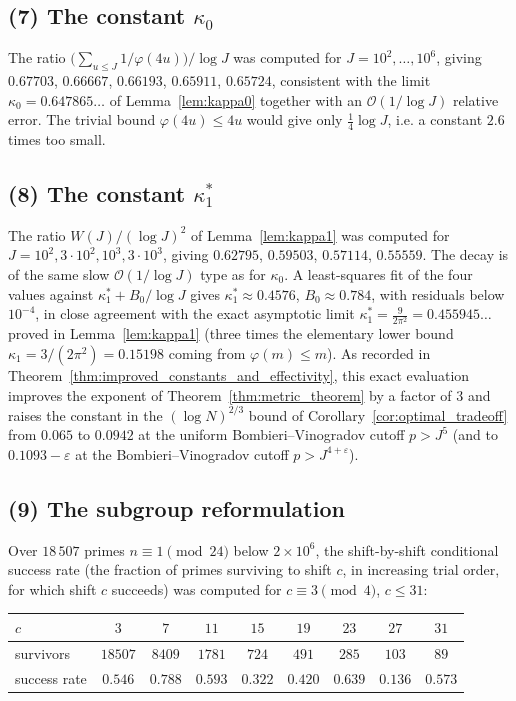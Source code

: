 \documentclass[11pt, a4paper]{article}
\theoremstyle{plain}
\theoremstyle{definition}
\begin{document}
\subsection*{(7) The constant $\kappa_0$}
The ratio $\big(\sum_{u\le J}1/\varphi(4u)\big)/\log J$ was computed for $J=10^{2},\dots,10^{6}$, giving $0.67703$, $0.66667$, $0.66193$, $0.65911$, $0.65724$, consistent with the limit $\kappa_0=0.647865\ldots$ of Lemma~\ref{lem:kappa0} together with an $\mathcal{O}(1/\log J)$ relative error. The trivial bound $\varphi(4u)\le4u$ would give only $\frac14\log J$, i.e. a constant $2.6$ times too small.

\subsection*{(8) The constant $\kappa_1^{\ast}$}
The ratio $W(J)/(\log J)^{2}$ of Lemma~\ref{lem:kappa1} was computed for $J=10^{2},3\cdot10^{2},10^{3},3\cdot10^{3}$, giving $0.62795$, $0.59503$, $0.57114$, $0.55559$. The decay is of the same slow $\mathcal{O}(1/\log J)$ type as for $\kappa_0$. A least-squares fit of the four values against $\kappa_1^{\ast}+B_0/\log J$ gives $\kappa_1^{\ast}\approx0.4576$, $B_0\approx0.784$, with residuals below $10^{-4}$, in close agreement with the exact asymptotic limit $\kappa_1^{\ast}=\frac{9}{2\pi^{2}}=0.455945\ldots$ proved in Lemma~\ref{lem:kappa1} (three times the elementary lower bound $\kappa_1=3/(2\pi^{2})=0.15198$ coming from $\varphi(m)\le m$). As recorded in Theorem~\ref{thm:improved_constants_and_effectivity}, this exact evaluation improves the exponent of Theorem~\ref{thm:metric_theorem} by a factor of $3$ and raises the constant in the $(\log N)^{2/3}$ bound of Corollary~\ref{cor:optimal_tradeoff} from $0.065$ to $0.0942$ at the uniform Bombieri--Vinogradov cutoff $p>J^{5}$ (and to $0.1093-\varepsilon$ at the Bombieri--Vinogradov cutoff $p>J^{4+\varepsilon}$).

\subsection*{(9) The subgroup reformulation}
Over $18\,507$ primes $n\equiv1\pmod{24}$ below $2\times10^{6}$, the shift-by-shift conditional success rate (the fraction of primes surviving to shift $c$, in increasing trial order, for which shift $c$ succeeds) was computed for $c\equiv3\pmod4$, $c\le31$:

\begin{center}
\begin{tabular}{lcccccccc}
\toprule
$c$ & $3$ & $7$ & $11$ & $15$ & $19$ & $23$ & $27$ & $31$\\
\midrule
survivors & $18507$ & $8409$ & $1781$ & $724$ & $491$ & $285$ & $103$ & $89$\\
success rate & $0.546$ & $0.788$ & $0.593$ & $\mathbf{0.322}$ & $0.420$ & $0.639$ & $\mathbf{0.136}$ & $0.573$\\
\bottomrule
\end{tabular}
\end{center}
\end{document}

